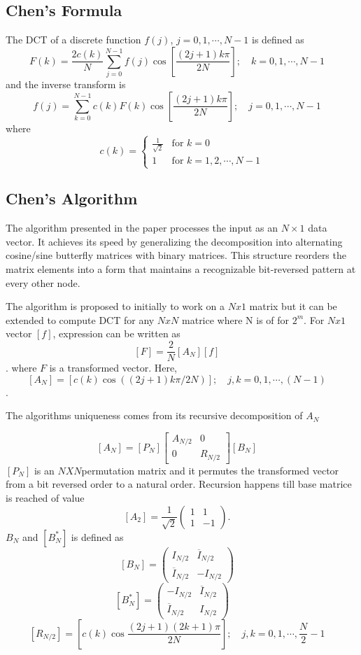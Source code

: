 \documentclass{article}
\begin{document}
\subsection{Chen's Formula}
The DCT of a discrete function $f(j)$, $j = 0, 1, \cdots, N-1$ is defined as
$$ F(k)=\frac{2c(k)}{N}\sum_{j=0}^{N-1}f(j)\cos\left[\frac{(2j+1)k\pi}{2N}\right]; \quad k=0,1,\cdots,N-1 \quad $$
and the inverse transform is
$$ f(j)=\sum_{k=0}^{N-1}c(k)F(k)\cos\left[\frac{(2j+1)k\pi}{2N}\right]; \quad j=0,1,\cdots,N-1 \quad $$
where
$$ c(k)=
\begin{cases}
\frac{1}{\sqrt{2}} & \text{for } k=0 \\
1 & \text{for } k=1,2,\cdots,N-1
\end{cases}
$$
\subsection{Chen's Algorithm}
The algorithm presented in the paper processes the input as an $N \times 1$ data vector. It achieves its speed by generalizing the decomposition into alternating cosine/sine butterfly matrices with binary matrices. This structure reorders the matrix elements into a form that maintains a recognizable bit-reversed pattern at every other node. 

The algorithm is proposed to initially to work on a $Nx1$ matrix but it can be extended to compute DCT for any $NxN$ matrice where N is of for $2^m$. For $Nx1$ vector $[f]$, expression can be written as $$ [F]=\frac{2}{N}[A_{N}][f] \quad $$. where $F$ is a transformed vector. Here,  $$
[A_{N}]=[c(k)\cos((2j+1)k\pi/2N)]; \quad j,k=0,1,\cdots,(N-1) \quad 
$$. 

The algorithms uniqueness comes from its recursive decomposition of $A_N$

$$
[A_{N}]=[P_{N}]\left[\begin{array}{c|c}
A_{N/2} & 0 \\
\hline
0 & R_{N/2}
\end{array}\right][B_{N}] \quad
$$
$[P_N]$ is an $ N X N $permutation matrix and it permutes the transformed vector from a bit reversed order to a natural order.
Recursion happens till base matrice is reached of value $$[A_{2}]=\frac{1}{\sqrt{2}}\begin{pmatrix}1 & 1\\ 1 & -1\end{pmatrix}. \quad 
$$
$B_N$ and $[B_{N}^{*}]$ is defined as 
$$
 [B_{N}]=\begin{pmatrix}I_{N/2} & \overline{I}_{N/2}\\ \overline{I}_{N/2} & -I_{N/2}\end{pmatrix} \quad 
$$
$$
 [B_{N}^{*}]=\begin{pmatrix}-I_{N/2} & \overline{I}_{N/2}\\ \overline{I}_{N/2} & I_{N/2}\end{pmatrix} \quad \quad 
$$
$$
[R_{N/2}]=[c(k)\cos\frac{(2j+1)(2k+1)\pi}{2N}];  \quad j,k=0,1,\cdots,\frac{N}{2}-1 \quad 
$$
\end{document}
